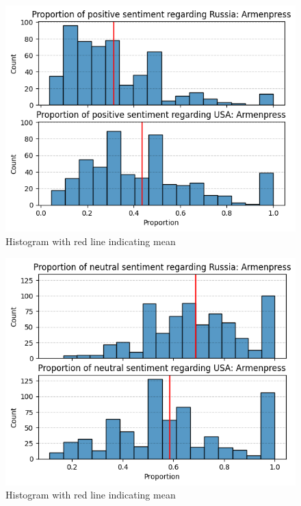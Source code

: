 \documentclass{IEEEtran}
\begin{document}
\begin{figure}
    \centering
    \includegraphics[width=1\linewidth]{figures/sig1.png}
    \caption{Histogram with red line indicating mean}
    \label{fig:positive_russia_armenpress}
\end{figure}

\begin{figure}
    \centering
    \includegraphics[width=1\linewidth]{figures/sig2.png}
    \caption{Histogram with red line indicating mean}
    \label{fig:neutral_russia_armenpress}
\end{figure}
\end{document}
